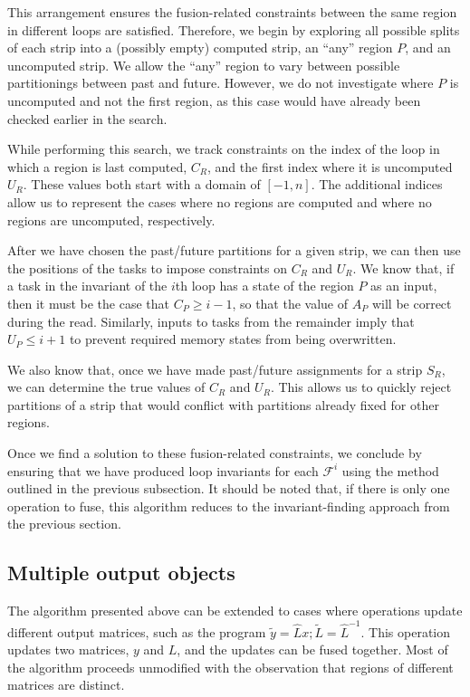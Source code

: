 \documentclass[12pt,letterpaper]{article}
\newcommand*{\opF}{\mathcal{F}}
\begin{document}
This arrangement ensures the fusion-related constraints between the same region in different loops are satisfied.
Therefore, we begin by exploring all possible splits of each strip into a (possibly empty) computed strip, an ``any'' region $P$, and an uncomputed strip.
We allow the ``any'' region to vary between possible partitionings between past and future.
However, we do not investigate where $P$ is uncomputed and not the first region, as this case would have already been checked earlier in the search.

While performing this search, we track constraints on the index of the loop in which a region is last computed, $C_R$, and the first index where it is uncomputed $U_R$.
These values both start with a domain of $[-1, n]$.
The additional indices allow us to represent the cases where no regions are computed and where no regions are uncomputed, respectively.

After we have chosen the past/future partitions for a given strip, we can then use the positions of the tasks to impose constraints on $C_R$ and $U_R$.
We know that, if a task in the invariant of the $i$th loop has a state of the region $P$ as an input, then it must be the case that $C_P \geq i - 1$, so that the value of $A_P$ will be correct during the read.
Similarly, inputs to tasks from the remainder imply that $U_P \leq i + 1$ to prevent required memory states from being overwritten.

We also know that, once we have made past/future assignments for a strip $S_R$, we can determine the true values of $C_R$ and $U_R$.
This allows us to quickly reject partitions of a strip that would conflict with partitions already fixed for other regions.

Once we find a solution to these fusion-related constraints, we conclude by ensuring that we have produced loop invariants for each $\opF^i$ using the method outlined in the previous subsection.
It should be noted that, if there is only one operation to fuse, this algorithm reduces to the invariant-finding approach from the previous section.

\subsection{Multiple output objects}
The algorithm presented above can be extended to cases where operations update different output matrices, such as the program $\widetilde{y} = \hat{L}x; \widetilde{L} = \hat{L}^{-1}$.
This operation updates two matrices, $y$ and $L$, and the updates can be fused together.
Most of the algorithm proceeds unmodified with the observation that regions of different matrices are distinct.
\end{document}
